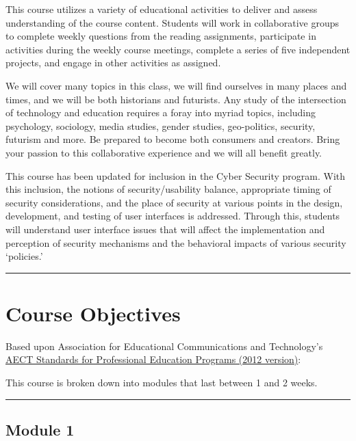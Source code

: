 \documentclass[]{article}
\begin{document}
This course utilizes a variety of educational activities to deliver and
assess understanding of the course content. Students will work in
collaborative groups to complete weekly questions from the reading
assignments, participate in activities during the weekly course
meetings, complete a series of five independent projects, and engage in
other activities as assigned.

We will cover many topics in this class, we will find ourselves in many
places and times, and we will be both historians and futurists. Any
study of the intersection of technology and education requires a foray
into myriad topics, including psychology, sociology, media studies,
gender studies, geo-politics, security, futurism and more. Be prepared
to become both consumers and creators. Bring your passion to this
collaborative experience and we will all benefit greatly.

This course has been updated for inclusion in the Cyber Security
program. With this inclusion, the notions of security/usability balance,
appropriate timing of security considerations, and the place of security
at various points in the design, development, and testing of user
interfaces is addressed. Through this, students will understand user
interface issues that will affect the implementation and perception of
security mechanisms and the behavioral impacts of various security
`policies.'

\begin{center}\rule{0.5\linewidth}{\linethickness}\end{center}

\hypertarget{course-objectives}{%
\section{Course Objectives}\label{course-objectives}}

Based upon Association for Educational Communications and Technology's
\href{http://aect.site-ym.com/resource/resmgr/AECT_Documents/AECT_Standards_adopted7_16_2.pdf}{AECT
Standards for Professional Education Programs (2012 version)}:

This course is broken down into modules that last between 1 and 2 weeks.

\begin{center}\rule{0.5\linewidth}{\linethickness}\end{center}

\hypertarget{module-1}{%
\subsection{Module 1}\label{module-1}}
\end{document}
